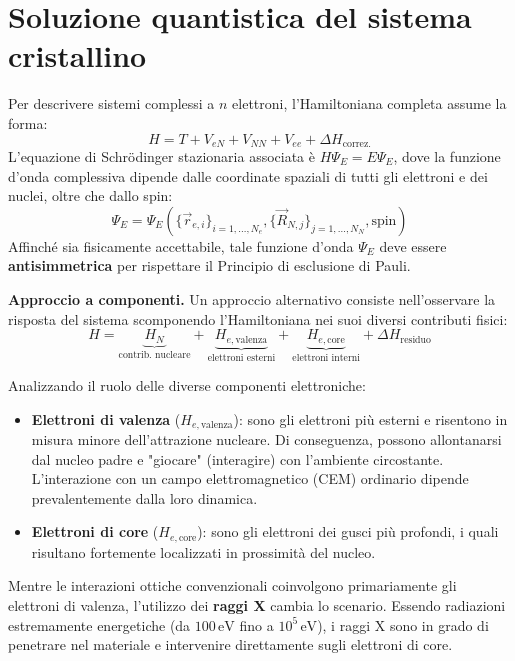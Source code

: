 \section{Soluzione quantistica del sistema cristallino}

Per descrivere sistemi complessi a \( n \) elettroni, l'Hamiltoniana completa assume la forma:
\begin{equation}
    H = T + V_{eN} + V_{NN} + V_{ee} + \Delta H_{\text{correz.}}
\end{equation}
L'equazione di Schrödinger stazionaria associata è \( H\Psi_E = E\Psi_E \), dove la funzione d'onda complessiva dipende dalle coordinate spaziali di tutti gli elettroni e dei nuclei, oltre che dallo spin:
\begin{equation}
    \Psi_E = \Psi_E(\{ \vec{r}_{e,i} \}_{i=1,\dots,N_e}, \{ \vec{R}_{N,j} \}_{j=1,\dots,N_N}, \text{spin})
\end{equation}
Affinché sia fisicamente accettabile, tale funzione d'onda \( \Psi_E \) deve essere \textbf{antisimmetrica} per rispettare il Principio di esclusione di Pauli.

\textbf{Approccio a componenti.} Un approccio alternativo consiste nell'osservare la risposta del sistema scomponendo l'Hamiltoniana nei suoi diversi contributi fisici:
\begin{equation}
    H = \underbrace{H_N}_{\text{contrib. nucleare}} + \underbrace{H_{e,\text{valenza}}}_{\text{elettroni esterni}} + \underbrace{H_{e,\text{core}}}_{\text{elettroni interni}} + \Delta H_{\text{residuo}}
\end{equation}

Analizzando il ruolo delle diverse componenti elettroniche:
\begin{itemize}
    \item \textbf{Elettroni di valenza} (\( H_{e,\text{valenza}} \)): sono gli elettroni più esterni e risentono in misura minore dell'attrazione nucleare. Di conseguenza, possono allontanarsi dal nucleo padre e "giocare" (interagire) con l'ambiente circostante. L'interazione con un campo elettromagnetico (CEM) ordinario dipende prevalentemente dalla loro dinamica.
    \item \textbf{Elettroni di core} (\( H_{e,\text{core}} \)): sono gli elettroni dei gusci più profondi, i quali risultano fortemente localizzati in prossimità del nucleo.
\end{itemize}

Mentre le interazioni ottiche convenzionali coinvolgono primariamente gli elettroni di valenza, l'utilizzo dei \textbf{raggi X} cambia lo scenario. Essendo radiazioni estremamente energetiche (da \( 100 \, \text{eV} \) fino a \( 10^5 \, \text{eV} \)), i raggi X sono in grado di penetrare nel materiale e intervenire direttamente sugli elettroni di core.

